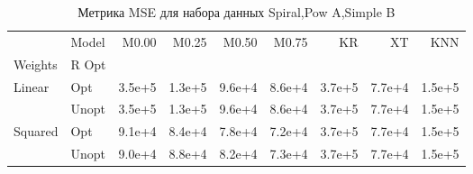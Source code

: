 \begin{table}
\caption{Метрика MSE для набора данных Spiral,Pow A,Simple B}
\label{tab:MSE_Spiral,Pow A,Simple B}
\begin{tabular}{llrrrrrrr}
\toprule
 & Model & M0.00 & M0.25 & M0.50 & M0.75 & KR & XT & KNN \\
Weights & R Opt &  &  &  &  &  &  &  \\
\midrule
\multirow[t]{2}{*}{Linear} & Opt & 3.5e+5 & 1.3e+5 & 9.6e+4 & 8.6e+4 & 3.7e+5 & 7.7e+4 & 1.5e+5 \\
 & Unopt & 3.5e+5 & 1.3e+5 & 9.6e+4 & 8.6e+4 & 3.7e+5 & 7.7e+4 & 1.5e+5 \\

\multirow[t]{2}{*}{Squared} & Opt & 9.1e+4 & 8.4e+4 & 7.8e+4 & 7.2e+4 & 3.7e+5 & 7.7e+4 & 1.5e+5 \\
 & Unopt & 9.0e+4 & 8.8e+4 & 8.2e+4 & 7.3e+4 & 3.7e+5 & 7.7e+4 & 1.5e+5 \\

\bottomrule
\end{tabular}
\end{table}
